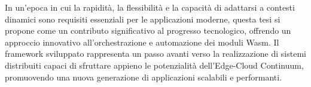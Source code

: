 In un’epoca in cui la rapidità, la flessibilità e la capacità di adattarsi a contesti dinamici sono requisiti essenziali per le applicazioni moderne, questa tesi si propone come un contributo significativo al progresso tecnologico, offrendo un approccio innovativo all’orchestrazione e automazione dei moduli Wasm. Il framework sviluppato rappresenta un passo avanti verso la realizzazione di sistemi distribuiti capaci di sfruttare appieno le potenzialità dell’Edge-Cloud Continuum, promuovendo una nuova generazione di applicazioni scalabili e performanti.
